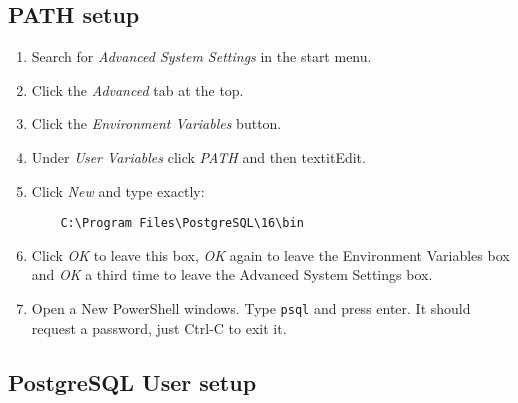 \subsection{PATH setup}

\begin{enumerate}

\item
	Search for \textit{Advanced System Settings} in the start menu.
	
\item 
	Click the \textit{Advanced} tab at the top.
	
\item 
	Click the \textit{Environment Variables} button.
	
\item 
	Under \textit{User Variables} click \textit{PATH} and then textit{Edit}.
	
\item 
	Click \textit{New} and type exactly:\\
\begin{verbatim}
	C:\Program Files\PostgreSQL\16\bin
\end{verbatim}

\item 
	Click \textit{OK} to leave this box, \textit{OK} again to leave the Environment Variables box and \textit{OK} a third time to leave the Advanced System Settings box.

\item
	Open a New PowerShell windows.
	Type \texttt{psql} and press enter.
	It should request a password, just Ctrl-C to exit it.

\end{enumerate}

\subsection{PostgreSQL User setup}

